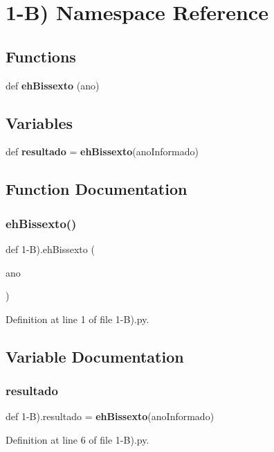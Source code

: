 \section{1-\/B) Namespace Reference}
\label{namespace1-_b_08}
\subsection*{Functions}
\begin{DoxyCompactItemize}
\item 
def \textbf{ eh\+Bissexto} (ano)
\end{DoxyCompactItemize}
\subsection*{Variables}
\begin{DoxyCompactItemize}
\item 
def \textbf{ resultado} = \textbf{ eh\+Bissexto}(ano\+Informado)
\end{DoxyCompactItemize}


\subsection{Function Documentation}
\mbox{\label{namespace1-_b_08_a2e61601fcda38031cb2b0400c51e9f6b}} 
\subsubsection{ehBissexto()}
{\footnotesize\ttfamily def 1-\/B).eh\+Bissexto (\begin{DoxyParamCaption}\item[{}]{ano }\end{DoxyParamCaption})}



Definition at line 1 of file 1-\/\+B).\+py.



\subsection{Variable Documentation}
\mbox{\label{namespace1-_b_08_a83af2453877173b9f3fe053b1f3aff56}} 
\subsubsection{resultado}
{\footnotesize\ttfamily def 1-\/B).resultado = \textbf{ eh\+Bissexto}(ano\+Informado)}



Definition at line 6 of file 1-\/\+B).\+py.

